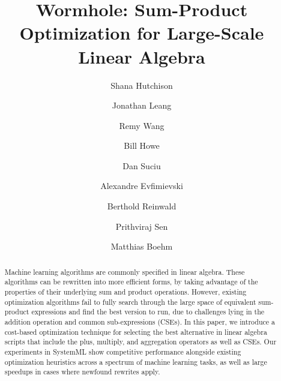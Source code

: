\documentclass[sigconf,10pt]{acmart}
\begin{document}
\title{Wormhole: Sum-Product Optimization for Large-Scale Linear Algebra}
\author{Shana Hutchison}%
\author{Jonathan Leang}
\author{Remy Wang}
\author{Bill Howe}
\author{Dan Suciu}
\author{Alexandre Evfimievski}
\author{Berthold Reinwald}
\author{Prithviraj Sen}
\author{Matthias Boehm}

\renewcommand{\shortauthors}{Hutchison, Leang, Howe, Suciu, Evfimievskit, Reinwald, Sen, Boehm}

\begin{abstract}
Machine learning algorithms are commonly specified in linear algebra.
These algorithms can be rewritten into more efficient forms, 
by taking advantage of the properties of their underlying sum 
and product operations.
However, existing optimization algorithms fail to fully search through the large space of equivalent sum-product expressions and find the best version to run, due to challenges lying in the addition operation and common sub-expressions (CSEs).
In this paper, we introduce a cost-based optimization technique for selecting the best alternative in linear algebra scripts that include the plus, multiply, and aggregation operators as well as CSEs.
Our experiments in SystemML show competitive performance alongside existing optimization heuristics across a spectrum of machine learning tasks, as well as large speedups in cases where newfound rewrites apply.
\end{abstract}

\end{document}
